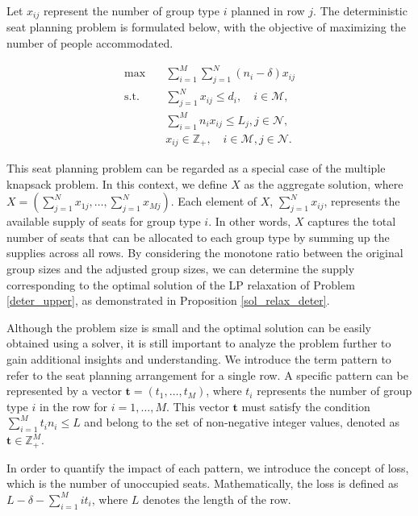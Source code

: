

Let $x_{ij}$ represent the number of group type $i$ planned in row $j$. The deterministic seat planning problem is formulated below, with the objective of maximizing the number of people accommodated.

\begin{equation}\label{deter_upper}
  \begin{aligned}
  \max \quad & \sum_{i=1}^{M}  \sum_{j= 1}^{N} (n_i- \delta) x_{ij} \\
  \text {s.t.} \quad & \sum_{j= 1}^{N} x_{ij} \leq d_{i}, \quad i \in \mathcal{M}, \\
  & \sum_{i=1}^{M} n_{i} x_{ij} \leq L_j, j \in \mathcal{N}, \\
  & x_{ij} \in \mathbb{Z}_{+}, \quad i \in \mathcal{M}, j \in \mathcal{N}.
  \end{aligned}
\end{equation}

This seat planning problem can be regarded as a special case of the multiple knapsack problem. In this context, we define $X$ as the aggregate solution, where $X = (\sum_{j=1}^{N} x_{1j}, \ldots, \sum_{j=1}^{N} x_{Mj})$. Each element of $X$, $\sum_{j=1}^{N} x_{ij}$, represents the available supply of seats for group type $i$. In other words, $X$ captures the total number of seats that can be allocated to each group type by summing up the supplies across all rows. By considering the monotone ratio between the original group sizes and the adjusted group sizes, we can determine the supply corresponding to the optimal solution of the LP relaxation of Problem \eqref{deter_upper}, as demonstrated in Proposition \ref{sol_relax_deter}.

Although the problem size is small and the optimal solution can be easily obtained using a solver, it is still important to analyze the problem further to gain additional insights and understanding.
We introduce the term pattern to refer to the seat planning arrangement for a single row. A specific pattern can be represented by a vector $\bm{t} = (t_1, \ldots, t_M)$, where $t_i$ represents the number of group type $i$ in the row for $i = 1,\ldots, M$. This vector $\bm{t}$ must satisfy the condition $\sum_{i=1}^{M} t_i n_i \leq L$ and belong to the set of non-negative integer values, denoted as $\bm{t} \in \mathbb{Z}_{+}^{M}$.

In order to quantify the impact of each pattern, we introduce the concept of loss, which is the number of unoccupied seats. Mathematically, the loss is defined as $L- \delta - \sum_{i =1}^{M} i t_i$, where $L$ denotes the length of the row.

